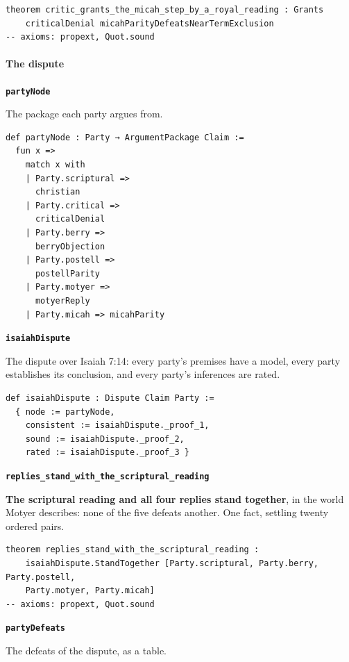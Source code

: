 \documentclass[11pt]{article}
\begin{document}
{\small\begin{verbatim}
theorem critic_grants_the_micah_step_by_a_royal_reading : Grants
    criticalDenial micahParityDefeatsNearTermExclusion
-- axioms: propext, Quot.sound
\end{verbatim}}
\paragraph*{The dispute}
\leavevmode\par
\par\medskip\noindent\textbf{\texttt{party\allowbreak{}Node}}\par\nobreak\noindent
The package each party argues from.

{\small\begin{verbatim}
def partyNode : Party → ArgumentPackage Claim :=
  fun x =>
    match x with
    | Party.scriptural =>
      christian
    | Party.critical =>
      criticalDenial
    | Party.berry =>
      berryObjection
    | Party.postell =>
      postellParity
    | Party.motyer =>
      motyerReply
    | Party.micah => micahParity
\end{verbatim}}
\par\medskip\noindent\textbf{\texttt{isaiah\allowbreak{}Dispute}}\par\nobreak\noindent
The dispute over Isaiah 7:14: every party's premises have a model, every party establishes its conclusion, and every party's inferences are rated.

{\small\begin{verbatim}
def isaiahDispute : Dispute Claim Party :=
  { node := partyNode,
    consistent := isaiahDispute._proof_1,
    sound := isaiahDispute._proof_2,
    rated := isaiahDispute._proof_3 }
\end{verbatim}}
\par\medskip\noindent\textbf{\texttt{replies\_\allowbreak{}stand\_\allowbreak{}with\_\allowbreak{}the\_\allowbreak{}scriptural\_\allowbreak{}reading}}\par\nobreak\noindent
\textbf{The scriptural reading and all four replies stand together}, in the world Motyer describes: none of the five defeats another. One fact, settling twenty ordered pairs.

{\small\begin{verbatim}
theorem replies_stand_with_the_scriptural_reading :
    isaiahDispute.StandTogether [Party.scriptural, Party.berry, Party.postell,
    Party.motyer, Party.micah]
-- axioms: propext, Quot.sound
\end{verbatim}}
\par\medskip\noindent\textbf{\texttt{party\allowbreak{}Defeats}}\par\nobreak\noindent
The defeats of the dispute, as a table.
\end{document}
